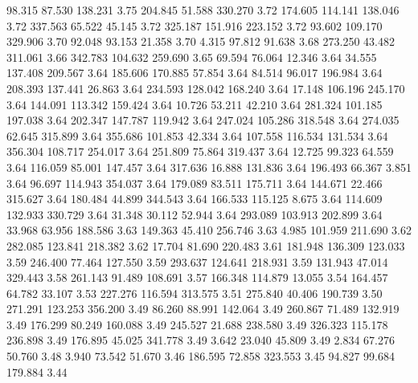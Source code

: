   98.315   87.530  138.231         3.75
 204.845   51.588  330.270         3.72
 174.605  114.141  138.046         3.72
 337.563   65.522   45.145         3.72
 325.187  151.916  223.152         3.72
  93.602  109.170  329.906         3.70
  92.048   93.153   21.358         3.70
   4.315   97.812   91.638         3.68
 273.250   43.482  311.061         3.66
 342.783  104.632  259.690         3.65
  69.594   76.064   12.346         3.64
  34.555  137.408  209.567         3.64
 185.606  170.885   57.854         3.64
  84.514   96.017  196.984         3.64
 208.393  137.441   26.863         3.64
 234.593  128.042  168.240         3.64
  17.148  106.196  245.170         3.64
 144.091  113.342  159.424         3.64
  10.726   53.211   42.210         3.64
 281.324  101.185  197.038         3.64
 202.347  147.787  119.942         3.64
 247.024  105.286  318.548         3.64
 274.035   62.645  315.899         3.64
 355.686  101.853   42.334         3.64
 107.558  116.534  131.534         3.64
 356.304  108.717  254.017         3.64
 251.809   75.864  319.437         3.64
  12.725   99.323   64.559         3.64
 116.059   85.001  147.457         3.64
 317.636   16.888  131.836         3.64
 196.493   66.367    3.851         3.64
  96.697  114.943  354.037         3.64
 179.089   83.511  175.711         3.64
 144.671   22.466  315.627         3.64
 180.484   44.899  344.543         3.64
 166.533  115.125    8.675         3.64
 114.609  132.933  330.729         3.64
  31.348   30.112   52.944         3.64
 293.089  103.913  202.899         3.64
  33.968   63.956  188.586         3.63
 149.363   45.410  256.746         3.63
   4.985  101.959  211.690         3.62
 282.085  123.841  218.382         3.62
  17.704   81.690  220.483         3.61
 181.948  136.309  123.033         3.59
 246.400   77.464  127.550         3.59
 293.637  124.641  218.931         3.59
 131.943   47.014  329.443         3.58
 261.143   91.489  108.691         3.57
 166.348  114.879   13.055         3.54
 164.457   64.782   33.107         3.53
 227.276  116.594  313.575         3.51
 275.840   40.406  190.739         3.50
 271.291  123.253  356.200         3.49
  86.260   88.991  142.064         3.49
 260.867   71.489  132.919         3.49
 176.299   80.249  160.088         3.49
 245.527   21.688  238.580         3.49
 326.323  115.178  236.898         3.49
 176.895   45.025  341.778         3.49
   3.642   23.040   45.809         3.49
   2.834   67.276   50.760         3.48
   3.940   73.542   51.670         3.46
 186.595   72.858  323.553         3.45
  94.827   99.684  179.884         3.44
